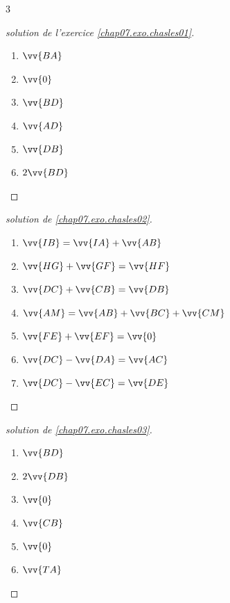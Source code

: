 \documentclass[main.tex]{subfiles}
\begin{document}
\begin{multicols}{3}
\begin{proof}[solution de l'exercice \ref{chap07.exo.chasles01}]\hfill 
\begin{enumerate} [label=\alph*), leftmargin=*]\scriptsize
\item $\vv{BA}$
\item $\vv{0}$
\item $\vv{BD}$
\item $\vv{AD}$
\item $\vv{DB}$
\item $2\vv{BD}$
\end{enumerate} 
\end{proof} 
\begin{proof}[solution de  \ref{chap07.exo.chasles02}]\hfill  
\begin{enumerate}[label=\alph*), leftmargin=*]\scriptsize
\item $\vv{IB}=\vv{IA}+\vv{AB}$
\item $\vv{HG}+\vv{GF}=\vv{HF}$
\item $\vv{DC}+\vv{CB}=\vv{DB}$
\item $\vv{AM}=\vv{AB}+\vv{BC}+\vv{CM}$
\item $\vv{FE}+\vv{EF}=\vv{0}$
\item $\vv{DC} - \vv{DA} =\vv{AC}$
\item $\vv{DC} - \vv{EC}  =\vv{DE}$ 
\end{enumerate} 
\end{proof}  
\begin{proof}[solution de  \ref{chap07.exo.chasles03}]\hfill  
\begin{enumerate}[label=\alph*), leftmargin=*]\scriptsize
\item $\vv{BD}$
\item $2\vv{DB}$
\item $\vv{0}$
\item $\vv{CB}$
\item $\vv{0}$
\item $\vv{TA}$
\end{enumerate} 
\end{proof}   
\end{multicols}
\end{document}
